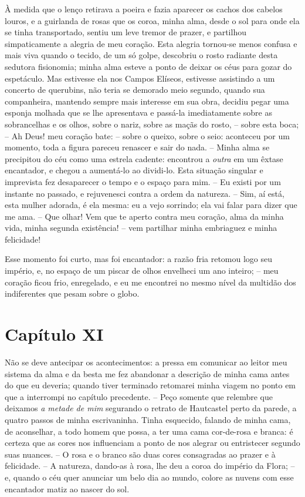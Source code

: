  À medida que o lenço retirava a poeira e fazia aparecer os cachos dos
cabelos louros, e a guirlanda de rosas que os coroa, minha alma, desde
o sol para onde ela se tinha transportado, sentiu um leve tremor de
prazer, e partilhou simpaticamente a alegria de meu coração. Esta
alegria tornou-se menos confusa e mais viva quando o tecido, de um só
golpe, descobriu o rosto radiante desta sedutora fisionomia; minha alma
esteve a ponto de deixar os céus para gozar do espetáculo. Mas
estivesse ela nos Campos Elíseos, estivesse assistindo a um concerto de
querubins, não teria se demorado meio segundo, quando sua companheira,
mantendo sempre mais interesse em sua obra, decidiu pegar uma esponja
molhada que se lhe apresentava e passá-la imediatamente sobre as
sobrancelhas e os olhos, sobre o nariz, sobre as maçãs do rosto, --
sobre esta boca; -- Ah Deus! meu coração bate: -- sobre o queixo,
sobre o seio: aconteceu por um momento, toda a figura pareceu renascer
e sair do nada. -- Minha alma se precipitou do céu como uma estrela
cadente: encontrou a \textit{outra} em um êxtase encantador, e chegou a
aumentá-lo ao dividi-lo. Esta situação singular e imprevista fez
desaparecer o tempo e o espaço para mim. -- Eu existi por um instante
no passado, e rejuvenesci contra a ordem da natureza. -- Sim, aí está,
esta mulher adorada, é ela mesma: eu a vejo sorrindo; ela vai falar
para dizer que me ama. -- Que olhar! Vem que te aperto contra meu
coração, alma da minha vida, minha segunda existência! -- vem
partilhar minha embriaguez e minha felicidade!

 Esse momento foi curto, mas foi encantador: a razão fria retomou logo
seu império, e, no espaço de um piscar de olhos envelheci um ano
inteiro; -- meu coração ficou frio, enregelado, e eu me encontrei no
mesmo nível da multidão dos indiferentes que pesam sobre o globo.

\section{Capítulo XI}

 Não se deve antecipar os acontecimentos: a pressa em comunicar ao
leitor meu sistema da alma e da besta me fez abandonar a descrição de
minha cama antes do que eu deveria; quando tiver terminado retomarei
minha viagem no ponto em que a interrompi no capítulo precedente. --
Peço somente que relembre que deixamos \textit{a metade de mim}
segurando o retrato de Hautcastel perto da parede, a quatro passos de
minha escrivaninha. Tinha esquecido, falando de minha cama, de
aconselhar, a todo homem que possa, a ter uma cama cor-de-rosa e
branca: é certeza que as cores nos influenciam a ponto de nos alegrar
ou entristecer segundo suas nuances. -- O rosa e o branco são duas
cores consagradas ao prazer e à felicidade. -- A natureza, dando-as à
rosa, lhe deu a coroa do império da Flora; -- e, quando o céu quer
anunciar um belo dia ao mundo, colore as nuvens com esse encantador
matiz ao nascer do sol.


